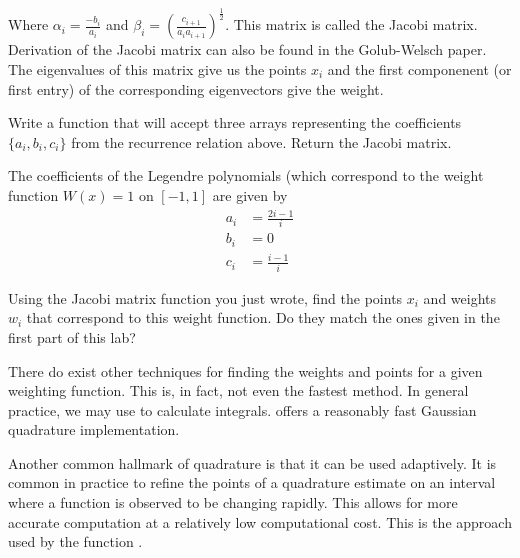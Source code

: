 Where $\alpha_i = \frac{-b_i}{a_i}$ and $\beta_i = (\frac{c_{i+1}}{a_ia_{i+1}})^{\frac{1}{2}}$.
This matrix is called the Jacobi matrix.
Derivation of the Jacobi matrix can also be found in the Golub-Welsch paper.
The eigenvalues of this matrix give us the points $x_i$ and the first componenent (or first entry) of the corresponding eigenvectors give the weight.

\begin{problem}
Write a function that will accept three arrays representing the coefficients $\{a_i, b_i, c_i\}$ from the recurrence relation above.
Return the Jacobi matrix.
\end{problem}

\begin{problem}
The coefficients of the Legendre polynomials (which correspond to the weight function $W(x) = 1$ on $[-1,1]$ are given by
\begin{align*}
a_i &= \frac{2i - 1}{i} \\
b_i &= 0 \\
c_i &= \frac{i-1}{i}
\end{align*}

Using the Jacobi matrix function you just wrote, find the points $x_i$ and weights $w_i$ that correspond to this weight function.
Do they match the ones given in the first part of this lab?

\end{problem}


There do exist other techniques for finding the weights and points for a given weighting function.
This is, in fact, not even the fastest method.
In general practice, we may use  to calculate integrals.
 offers a reasonably fast Gaussian quadrature implementation.

Another common hallmark of quadrature is that it can be used adaptively.
It is common in practice to refine the points of a quadrature estimate on an interval where a function is observed to be changing rapidly.
This allows for more accurate computation at a relatively low computational cost.
This is the approach used by the function .

